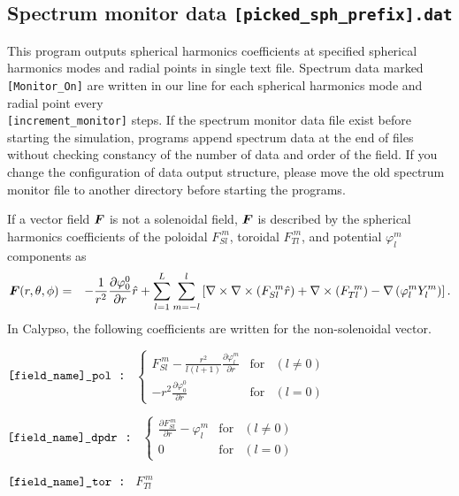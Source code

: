 \subsection{Spectrum monitor data {\tt [picked\_sph\_prefix].dat}}
This program outputs spherical harmonics coefficients at specified spherical harmonics modes and radial points in single text file. Spectrum data marked \verb|[Monitor_On]| are written in our line for each spherical harmonics mode and radial point every \\
\verb|[increment_monitor]| steps. If the spectrum monitor data file exist before starting the simulation, programs append spectrum data at the end of files without checking constancy of the number of data and order of the field. If you change the configuration of data output structure, please move the old spectrum monitor file to another directory before starting the programs.

If a vector field $\mbox{\boldmath$F$}$ is not a solenoidal field, $\mbox{\boldmath$F$}$ is described by the spherical harmonics coefficients of the poloidal $F_{Sl}^{\ m}$, toroidal $F_{Tl}^{\ m}$, and potential $\varphi_{l}^{m}$ components as
\begin{eqnarray}
\mbox{\boldmath$F$}(r, \theta, \phi) & = &  - \frac{1}{r^{2}}\frac{\partial \varphi_{0}^{0}}{\partial r} \hat{r}
 + \sum_{l=1}^{L} \sum_{m=-l}^{l} 
\left[\nabla \times \nabla \times \left( F_{Sl}^{\ m} \hat{r} \right) +  \nabla \times \left(F_{Tl}^{\ m}\right)
 - \nabla \left(\varphi_{l}^{m} Y_{l}^{m} \right)\right].
\nonumber
\end{eqnarray}
In Calypso, the following coefficients are written for the non-solenoidal vector.
\begin{description}
\item{\tt  $\verb|[field_name]_pol|$ : }
 $\left\{\begin{array}{ccr}
\displaystyle{
F_{Sl}^{\ m} - \frac{r^{2}}{l \left(l+1\right)} \frac{\partial \varphi_{l}^{m}}{\partial r} }
& \mbox{for} & \left (l \ne 0 \right)\\
\displaystyle{
 -r^{2} \frac{\partial \varphi_{0}^{0}}{\partial r}
} & \mbox{for} & \left (l = 0 \right)
\end{array}
\right.$
\item{\tt  $\verb|[field_name]_dpdr|$ : } 
$
\left\{
\begin{array}{ccr}
\displaystyle{
\frac{\partial F_{Sl}^{\ m}}{\partial r} - \varphi_{l}^{m}}
 & \mbox{for} & \left (l \ne 0 \right)\\
 0 & \mbox{for} & \left (l = 0 \right)
\end{array}
\right. $
\item{\tt  $\verb|[field_name]_tor|$ : }  $F_{Tl}^{\ m}$
\end{description}



